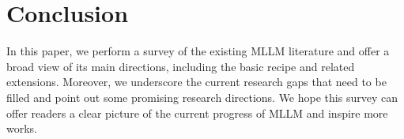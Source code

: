 \section{Conclusion}
\label{sec:conclusion}

In this paper, we perform a survey of the existing MLLM literature and offer a broad view of its main directions, including the basic recipe and related extensions. Moreover, we underscore the current research gaps that need to be filled and point out some promising research directions. We hope this survey can offer readers a clear picture of the current progress of MLLM and inspire more works.

